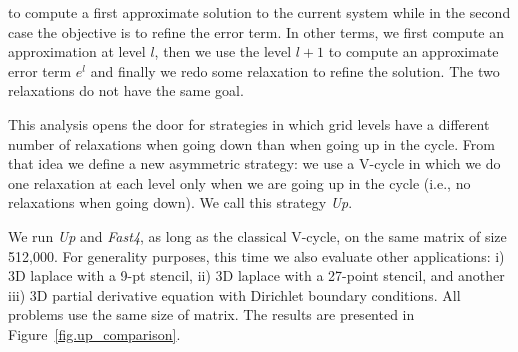 to
compute a first approximate solution to the current system while in the second
case the objective is to refine the error term. In other terms, we first
compute an approximation at level $l$, then we use the level $l+1$ to compute
an approximate error term $e^l$ and finally we redo some relaxation to refine
the solution. The two relaxations do not have the same goal.

This analysis opens the door for strategies in which grid levels have a
different number of relaxations when going down than when going up in the
cycle.   From that idea we define a new asymmetric strategy: we use a
V-cycle in which we do one relaxation at each level only when we are going up
in the cycle (i.e., no relaxations when going down).  We call this strategy
\emph{Up}.

We run \emph{Up} and \emph{Fast4}, as long as the classical V-cycle, on the
same matrix of size 512,000. For generality purposes, this time we also
evaluate other applications: i) 3D laplace with a 9-pt stencil, ii) 3D laplace
with a 27-point stencil, and another iii) 3D partial derivative equation with
Dirichlet boundary conditions. All problems use the same size of matrix. The
results are presented in Figure~\ref{fig.up_comparison}.

